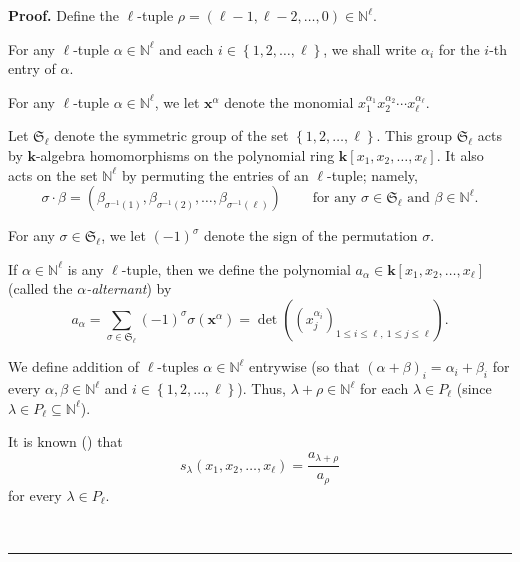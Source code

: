 \documentclass[numbers=enddot,12pt,final,onecolumn,notitlepage]{scrartcl}%
\theoremstyle{definition}
\newenvironment{proof}[1][Proof]{\noindent\textbf{#1.} }{\ \rule{0.5em}{0.5em}}
\let\sumnonlimits\sum
\renewcommand{\sum}{\sumnonlimits\limits}
\newenvironment{vershort}{}{}
\begin{document}
\begin{vershort}
\begin{proof}
Define the $\ell$-tuple $\rho=\left(  \ell-1,\ell-2,\ldots,0\right)
\in\mathbb{N}^{\ell}$.

For any $\ell$-tuple $\alpha\in\mathbb{N}^{\ell}$ and each $i\in\left\{
1,2,\ldots,\ell\right\}  $, we shall write $\alpha_{i}$ for the $i$-th entry
of $\alpha$.

For any $\ell$-tuple $\alpha\in\mathbb{N}^{\ell}$, we let $\mathbf{x}^{\alpha
}$ denote the monomial $x_{1}^{\alpha_{1}}x_{2}^{\alpha_{2}}\cdots x_{\ell
}^{\alpha_{\ell}}$.

Let $\mathfrak{S}_{\ell}$ denote the symmetric group of the set $\left\{
1,2,\ldots,\ell\right\}  $. This group $\mathfrak{S}_{\ell}$ acts by
$\mathbf{k}$-algebra homomorphisms on the polynomial ring $\mathbf{k}\left[
x_{1},x_{2},\ldots,x_{\ell}\right]  $. It also acts on the set $\mathbb{N}%
^{\ell}$ by permuting the entries of an $\ell$-tuple; namely,%
\[
\sigma\cdot\beta=\left(  \beta_{\sigma^{-1}\left(  1\right)  },\beta
_{\sigma^{-1}\left(  2\right)  },\ldots,\beta_{\sigma^{-1}\left(  \ell\right)
}\right)  \ \ \ \ \ \ \ \ \ \ \text{for any }\sigma\in\mathfrak{S}_{\ell
}\text{ and }\beta\in\mathbb{N}^{\ell}.
\]


For any $\sigma\in\mathfrak{S}_{\ell}$, we let $\left(  -1\right)  ^{\sigma}$
denote the sign of the permutation $\sigma$.

If $\alpha\in\mathbb{N}^{\ell}$ is any $\ell$-tuple, then we define the
polynomial $a_{\alpha}\in\mathbf{k}\left[  x_{1},x_{2},\ldots,x_{\ell}\right]
$ (called the $\alpha$\emph{-alternant}) by%
\[
a_{\alpha}=\sum_{\sigma\in\mathfrak{S}_{\ell}}\left(  -1\right)  ^{\sigma
}\sigma\left(  \mathbf{x}^{\alpha}\right)  =\det\left(  \left(  x_{j}%
^{\alpha_{i}}\right)  _{1\leq i\leq\ell,\ 1\leq j\leq\ell}\right)  .
\]


We define addition of $\ell$-tuples $\alpha\in\mathbb{N}^{\ell}$ entrywise (so
that $\left(  \alpha+\beta\right)  _{i}=\alpha_{i}+\beta_{i}$ for every
$\alpha,\beta\in\mathbb{N}^{\ell}$ and $i\in\left\{  1,2,\ldots,\ell\right\}
$). Thus, $\lambda+\rho\in\mathbb{N}^{\ell}$ for each $\lambda\in P_{\ell}$
(since $\lambda\in P_{\ell}\subseteq\mathbb{N}^{\ell}$).

It is known (\cite[Corollary 2.6.7]{GriRei}) that%
\begin{equation}
s_{\lambda}\left(  x_{1},x_{2},\ldots,x_{\ell}\right)  =\dfrac{a_{\lambda
+\rho}}{a_{\rho}} \label{pf.thm.G.pieri.short.slam}%
\end{equation}
for every $\lambda\in P_{\ell}$.


\end{proof}
\end{vershort}
\end{document}
